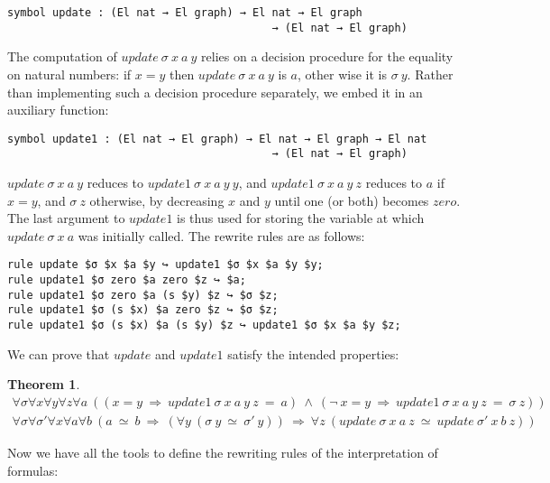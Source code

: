 \documentclass[submission,copyright,creativecommons]{eptcs}
\def\imp{\mathbin{\Rightarrow}}
\def\fa{{\forall}}
\DeclareMathOperator{\blneg}{{\neg}}
\def\conj{\mathbin{\wedge}}
\newtheorem{theorem}{Theorem}[section]
\begin{document}
\begin{lstlisting}
symbol update : (El nat → El graph) → El nat → El graph
                                         → (El nat → El graph)
\end{lstlisting} 

The computation of $update~\sigma~x~a~y$ relies on a decision procedure for the equality on natural numbers: if $x=y$ then $update~\sigma~x~a~y$ is $a$, other wise it is $\sigma~y$. Rather than implementing such a decision procedure separately, we embed it in an auxiliary function:

\begin{lstlisting}
symbol update1 : (El nat → El graph) → El nat → El graph → El nat
                                         → (El nat → El graph)
\end{lstlisting} 

$update~\sigma~x~a~y$ reduces to $update1~\sigma~x~a~y~y$, and $update1~\sigma~x~a~y~z$ reduces to $a$ if $x=y$, and $\sigma~z$ otherwise, by decreasing $x$ and $y$ until one (or both) becomes $zero$. The last argument to $update1$ is thus used for storing the variable at which $update~\sigma~x~a$ was initially called. The rewrite rules are as follows:

\begin{lstlisting}
rule update $σ $x $a $y ↪ update1 $σ $x $a $y $y;
rule update1 $σ zero $a zero $z ↪ $a;
rule update1 $σ zero $a (s $y) $z ↪ $σ $z;
rule update1 $σ (s $x) $a zero $z ↪ $σ $z;
rule update1 $σ (s $x) $a (s $y) $z ↪ update1 $σ $x $a $y $z;
\end{lstlisting}

We can prove that $update$ and $update1$ satisfy the intended properties:

\begin{theorem}
\begin{equation*}
\begin{split}
\fa \sigma \fa x \fa y \fa z \fa a ~((x = y \ \imp \ update1 \ \sigma \ x \ a \ y \ z \ = \ a) \ \conj \ (\blneg \ x = y \ \imp \ update1 \ \sigma \ x \ a \ y \ z \ = \ \sigma \ z))
\\
\fa \sigma \fa \sigma' \fa x \fa a \fa b~ (a \ \simeq \ b \ \imp \ (\fa y~ (\sigma \ y \ \simeq \ \sigma' \ y)) \ \imp \ \fa z~ (update \ \sigma \ x \ a \ z \ \simeq \ update \ \sigma' \ x \ b \ z))
\end{split}
\end{equation*}
\end{theorem}

Now we have all the tools to define the rewriting rules of the interpretation of formulas:
\end{document}
